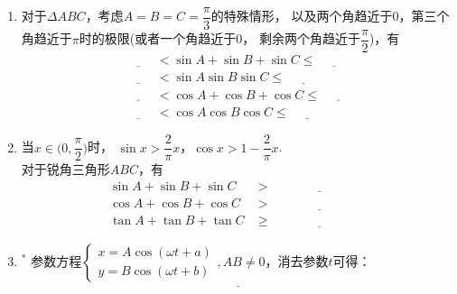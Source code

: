 \documentclass{article}
\newif\ifte
\renewcommand\leq\leqslant
\renewcommand\geq\geqslant
\begin{document}
\begin{multicols}{2}
\begin{enumerate}[leftmargin=20pt]
\item 对于$ \Delta ABC $，考虑$ A=B=C=\dfrac{\pi}{3} $的特殊情形，
以及两个角趋近于0，第三个角趋近于$ \pi $时的极限(或者一个角趋近于0，
剩余两个角趋近于$ \dfrac{\pi}{2} $)，有
\begin{gather*}
    \underline{\ \ifte 0\else \hspace{1cm} \fi\ }<
    \sin A +\sin B +\sin C \leq \underline{\ \ifte 
        \frac{3\sqrt{3}}{2} \else \hspace{1cm} \fi\ } \\    
    \underline{\ \ifte 0\else \hspace{1cm} \fi\ }<
    \sin A \sin B \sin C \leq \underline{\ \ifte 
        \frac{3\sqrt{3}}{8} \else \hspace{1cm} \fi\ } \\
    \underline{\ \ifte 1\else \hspace{1cm} \fi\ }<
    \cos A +\cos B +\cos C \leq \underline{\ \ifte 
        \frac{3}{2} \else \hspace{1cm} \fi\ } \\
    \underline{\ \ifte -1\else \hspace{1cm} \fi\ }<
    \cos A\cos B\cos C \leq \underline{\ \ifte 
        \frac{1}{8} \else \hspace{1cm} \fi\ }
\end{gather*}

\item 当$ x\in\Big(0,\dfrac{\pi}{2}\Big) $时，
$ \sin x>\dfrac{2}{\pi}x $，$ \cos x>1-\dfrac{2}{\pi}x $.\\
对于锐角三角形$ ABC $，有
\begin{align*}
    \sin A +\sin B +\sin C &>\underline{\ \ifte 
        \dfrac{2}{\pi}(A+B+C)=2 \else \hspace{3cm} \fi\ } \\
    \cos A +\cos B +\cos C &>\underline{\ \ifte 
        3-\dfrac{2}{\pi}(A+B+C)=1 \else \hspace{3cm} \fi\ } \\
    \tan A+\tan B +\tan C &\geq \underline{\ \ifte 
        3\tan\dfrac{A+B+C}{3}=3\sqrt{3} \else \hspace{3cm} \fi\ }
\end{align*}

\item $^*$ 参数方程$ \left\{ \begin{aligned}
    x=A\cos(\omega t+a) \\
    y=B\cos(\omega t+b)
\end{aligned}
\right. , AB\neq 0 $，消去参数$ t $可得：
\begin{align*}
    \underline{\ \ifte \dfrac{x^2}{A^2}+\dfrac{y^2}{B^2}-
        2\dfrac{xy}{AB}\cos(a-b)=\sin^2(a-b)\else \hspace{6cm} \fi\ }
\end{align*}


\end{enumerate}
\end{multicols}
\end{document}
